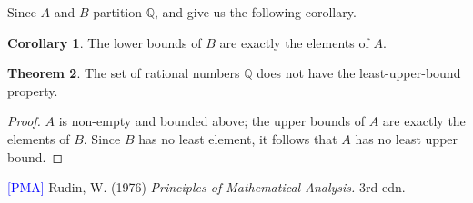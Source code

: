 \documentclass[12pt]{article}
\theoremstyle{definition}
\newtheorem{theorem}{Theorem}
\newtheorem{corollary}[theorem]{Corollary}
\begin{document}
Since \( A \) and \( B \) partition \( \mathbb{Q} \),  and  give us the following corollary.

\begin{corollary}
    The lower bounds of \( B \) are exactly the elements of \( A \).
\end{corollary}

\begin{theorem}
    The set of rational numbers \( \mathbb{Q} \) does not have the least-upper-bound property.
\end{theorem}

\begin{proof}
    \( A \) is non-empty and bounded above; the upper bounds of \( A \) are exactly the elements of \( B \). Since \( B \) has no least element, it follows that \( A \) has no least upper bound.
\end{proof}

\noindent \hrulefill

\noindent \hypertarget{pma}{\textcolor{blue}{[PMA]} Rudin, W. (1976) \textit{Principles of Mathematical Analysis.} 3rd edn.}
\end{document}
